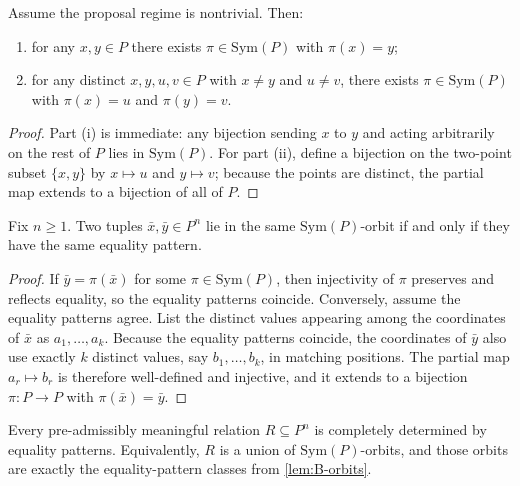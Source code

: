 \begin{lemma}
\label{lem:B-two-transitive}
Assume the proposal regime is nontrivial. Then:
\begin{enumerate}[label=(\roman*), leftmargin=2.5em]
    \item for any $x,y\in P$ there exists $\pi\in\mathrm{Sym}(P)$ with $\pi(x)=y$;
    \item for any distinct $x,y,u,v\in P$ with $x\neq y$ and $u\neq v$, there exists $\pi\in\mathrm{Sym}(P)$ with $\pi(x)=u$ and $\pi(y)=v$.
\end{enumerate}
\end{lemma}

\begin{proof}
Part (i) is immediate: any bijection sending $x$ to $y$ and acting arbitrarily on the rest of $P$ lies in $\mathrm{Sym}(P)$. For part (ii), define a bijection on the two-point subset $\{x,y\}$ by $x\mapsto u$ and $y\mapsto v$; because the points are distinct, the partial map extends to a bijection of all of $P$.
\end{proof}

\begin{lemma}
\label{lem:B-orbits}
Fix $n\ge 1$. Two tuples $\bar x,\bar y\in P^n$ lie in the same $\mathrm{Sym}(P)$-orbit if and only if they have the same equality pattern.
\end{lemma}

\begin{proof}
If $\bar y=\pi(\bar x)$ for some $\pi\in\mathrm{Sym}(P)$, then injectivity of $\pi$ preserves and reflects equality, so the equality patterns coincide. Conversely, assume the equality patterns agree. List the distinct values appearing among the coordinates of $\bar x$ as $a_1,\dots,a_k$. Because the equality patterns coincide, the coordinates of $\bar y$ also use exactly $k$ distinct values, say $b_1,\dots,b_k$, in matching positions. The partial map $a_r\mapsto b_r$ is therefore well-defined and injective, and it extends to a bijection $\pi:P\to P$ with $\pi(\bar x)=\bar y$.
\end{proof}

\begin{theorem}
\label{thm:B-equality-pattern}
Every pre-admissibly meaningful relation $R\subseteq P^n$ is completely determined by equality patterns. Equivalently, $R$ is a union of $\mathrm{Sym}(P)$-orbits, and those orbits are exactly the equality-pattern classes from \cref{lem:B-orbits}.
\end{theorem}

